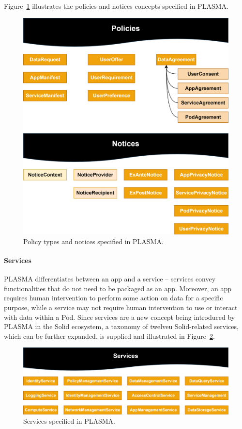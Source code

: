 Figure~\ref{fig:plasma_policies} illustrates the policies and notices concepts specified in PLASMA.

\begin{figure}[htb]
    \centering
    \includegraphics[width=0.8\linewidth]{figures/chapter-4/policies_notices.png}
    \caption{Policy types and notices specified in PLASMA.}
    \label{fig:plasma_policies}
\end{figure}

\paragraph{Services}
PLASMA differentiates between an app and a service -- services convey functionalities that do not need to be packaged as an app.
Moreover, an app requires human intervention to perform some action on data for a specific purpose, while a service may not require human intervention to use or interact with data within a Pod.
Since services are a new concept being introduced by PLASMA in the Solid ecosystem, a taxonomy of twelveu Solid-related services, which can be further expanded, is supplied and illustrated in Figure~\ref{fig:plasma_services}.

\begin{figure}[htb]
    \centering
    \includegraphics[width=\linewidth]{figures/chapter-4/services.png}
    \caption{Services specified in PLASMA.}
    \label{fig:plasma_services}
\end{figure}


